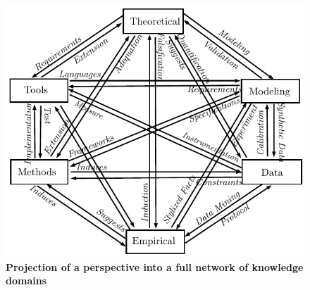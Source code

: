 \documentclass[runningheads,a4paper]{llncs2e/llncs}
\begin{document}





\begin{figure}
\centering
\includegraphics[width=\textwidth]{figures/framework}
\caption{\textbf{Projection of a perspective into a full network of knowledge domains}}
\label{fig:fwk}
\end{figure}
\end{document}
